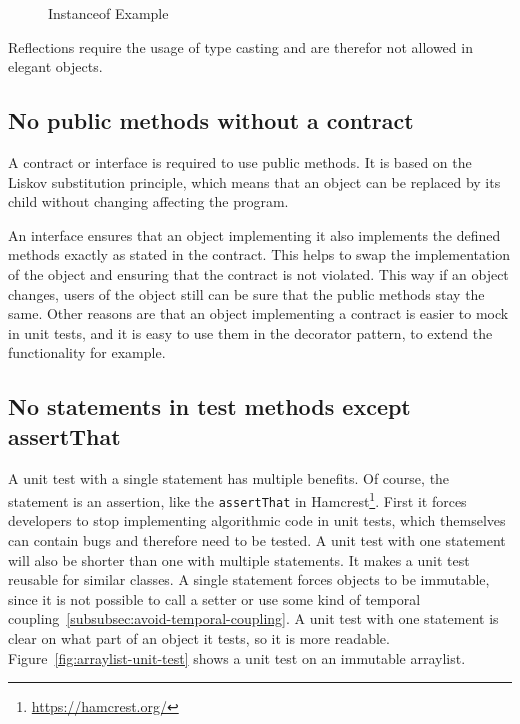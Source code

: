 \begin{figure}[h]
    \caption{Instanceof Example}
    
    \label{fig:instanceof-example}
\end{figure}

Reflections require the usage of type casting and are therefor not allowed in elegant objects.\cite{elegant-objects}

\subsection{No public methods without a contract}\label{subsec:no-public-methods-without-a-contract}
A contract or interface is required to use public methods.
It is based on the Liskov substitution principle, which means that an object can be replaced by its child without changing affecting the program.

An interface ensures that an object implementing it also implements the defined methods exactly as stated in the contract.
This helps to swap the implementation of the object and ensuring that the contract is not violated.
This way if an object changes, users of the object still can be sure that the public methods stay the same.
Other reasons are that an object implementing a contract is easier to mock in unit tests, and it is easy to use them in the decorator pattern, to extend the functionality for example.\cite{elegant-objects}


\subsection{No statements in test methods except assertThat}\label{subsec:no-statements-in-test-methods-except-assertthat}
A unit test with a single statement has multiple benefits.
Of course, the statement is an assertion, like the \texttt{assertThat} in Hamcrest\footnote{\url{https://hamcrest.org/}}.
First it forces developers to stop implementing algorithmic code in unit tests, which themselves can contain bugs and therefore need to be tested.
A unit test with one statement will also be shorter than one with multiple statements.
It makes a unit test reusable for similar classes.
A single statement forces objects to be immutable, since it is not possible to call a setter or use some kind of temporal coupling\ \ref{subsubsec:avoid-temporal-coupling}.
A unit test with one statement is clear on what part of an object it tests, so it is more readable.
Figure\ \ref{fig:arraylist-unit-test} shows a unit test on an immutable arraylist.\cite{elegant-objects}

